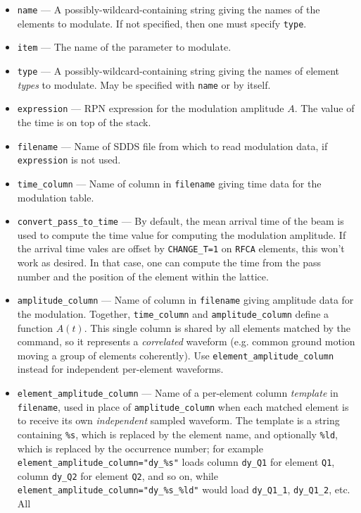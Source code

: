 \documentclass[11pt]{article}
\begin{document}
\begin{itemize}
\item \verb|name| --- A possibly-wildcard-containing string giving the names of the
        elements to modulate. If not specified, then one must specify \verb|type|.
\item \verb|item| --- The name of the parameter to modulate.
\item \verb|type| --- A possibly-wildcard-containing string giving the names of element
        {\em types} to modulate.  May be specified with \verb|name| or by itself.
\item \verb|expression| --- RPN expression for the modulation amplitude $A$.  The value
  of the time is on top of the stack. 
\item \verb|filename| --- Name of SDDS file from which to read modulation data, if
  \verb|expression| is not used.
\item \verb|time_column| --- Name of column in \verb|filename| giving time data for the
  modulation table.
\item \verb|convert_pass_to_time| --- By default, the mean arrival time of the beam is used to
  compute the time value for computing the modulation amplitude.
  If the arrival time vales are offset by \verb|CHANGE_T=1| on \verb|RFCA| elements, this won't
  work as desired. In that case, one can compute the time from the pass number and the position
  of the element within the lattice.
\item \verb|amplitude_column| --- Name of column in \verb|filename| giving amplitude data
  for the modulation.  Together, \verb|time_column| and \verb|amplitude_column| define
  a function $A(t)$.  This single column is shared by all elements matched by the command, so it
  represents a {\em correlated} waveform (e.g. common ground motion moving a group of elements
  coherently).  Use \verb|element_amplitude_column| instead for independent per-element waveforms.
\item \verb|element_amplitude_column| --- Name of a per-element column {\em template} in
  \verb|filename|, used in place of \verb|amplitude_column| when each matched element is to receive
  its own {\em independent} sampled waveform.  The template is a string containing \verb|%s|, which is
  replaced by the element name, and optionally \verb|%ld|, which is replaced by the occurrence number;
  for example \verb|element_amplitude_column="dy_%s"| loads column \verb|dy_Q1| for element
  \verb|Q1|, column \verb|dy_Q2| for element \verb|Q2|, and so on, while
  \verb|element_amplitude_column="dy_%s_%ld"| would load \verb|dy_Q1_1|, \verb|dy_Q1_2|, etc.  All

\end{itemize}
\end{document}
